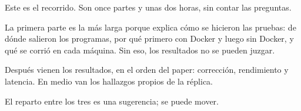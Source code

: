 Este es el recorrido. Son once partes y unas dos horas, sin contar las preguntas.

La primera parte es la más larga porque explica cómo se hicieron las pruebas: de dónde salieron los programas, por qué primero con Docker y luego sin Docker, y qué se corrió en cada máquina. Sin eso, los resultados no se pueden juzgar.

Después vienen los resultados, en el orden del paper: corrección, rendimiento y latencia. En medio van los hallazgos propios de la réplica.

El reparto entre los tres es una sugerencia; se puede mover.
